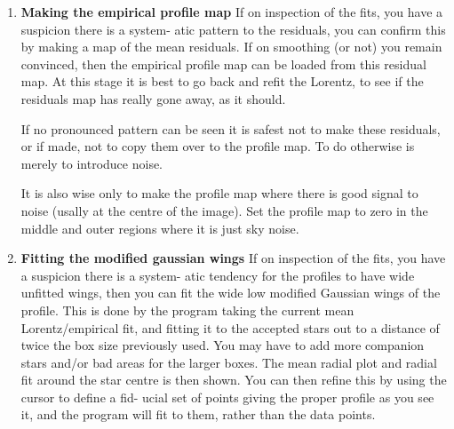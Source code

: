 \begin{small}
{{\begin{enumerate}

   In this stage, the area displayed round each star is roughly twice the
   linear size of the area actually used in the fit, so you need not
   worry about bad areas or faint stars near the edge, but stars whose
   profiles get near the central region should be marked.
   You can also mark and remove mistaken points using the cursor in the
   same way.

   You can then re-estimate the fit.

 \item {\bf Making the empirical profile map}
   If on inspection of the fits, you have a suspicion there is a system-
   atic pattern to the residuals, you can confirm this by making a map
   of the mean residuals. If on smoothing (or not) you remain convinced,
   then the empirical profile map can be loaded from this residual map.
   At this stage it is best to go back and refit the Lorentz, to see if
   the residuals map has really gone away, as it should.

   If no pronounced pattern  can be seen it is safest  not to make these
   residuals, or if made, not to copy them over to the profile map. To do
   otherwise is merely to introduce noise.

   It is also wise only to make the profile map where there is good
   signal to noise (usally at the centre of the image). Set the profile
   map to zero in the middle and outer regions where it is just sky
   noise.

 \item {\bf Fitting the modified gaussian wings}
   If on inspection of the fits, you have a suspicion there is a system-
   atic tendency for the profiles to have wide unfitted wings, then you
   can fit the wide low modified Gaussian wings of the profile. This is
   done by the program taking the current mean Lorentz/empirical fit, and
   fitting it to the accepted stars out to a distance of twice the box
   size previously used.
   You may have to add more companion stars and/or bad areas for the
   larger boxes.
   The mean radial plot and radial fit around the star centre is then
   shown. You can then refine this by using the cursor to define a fid-
   ucial set of points giving the proper profile as you see it, and the
   program will fit to them, rather than the data points.


\end{enumerate}}}
\end{small}
